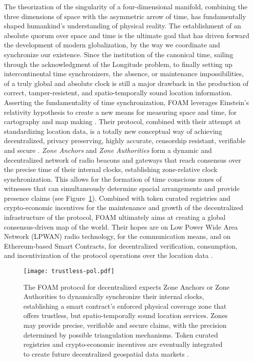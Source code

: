 The theorization of the singularity of a four-dimensional manifold, combining the three dimensions of space with the asymmetric arrow of time, has fundamentally shaped humankind's understanding of physical reality. The establishment of an absolute quorum over space and time is the ultimate goal that has driven forward the development of modern globalization, by the way we coordinate and synchronize our existence. Since the institution of the canonical time, sailing through the acknowledgment of the Longitude problem, to finally setting up intercontinental time synchronizers, the absence, or maintenance impossibilities, of a truly global and absolute clock is still a major drawback in the production of correct, tamper-resistent, and spatio-temporally sound location information. Asserting the fundamentality of time synchronization, FOAM leverages Einstein's relativity hypothesis to create a new means for measuring space and time, for cartography and map making \cite{king_2020}. Their protocol, combined with their attempt at standardizing location data, is a totally new conceptual way of achieving decentralized, privacy preserving, highly accurate, censorship resistant, verifiable and secure \pol{}. \emph{Zone Anchors} and \emph{Zone Authorities} form a dynamic and decentralized network of radio beacons and gateways that reach consensus over the precise time of their internal clocks, establishing zone-relative clock synchronization. This allows for the formation of time conscious zones of witnesses that can simultaneously determine spacial arrangements and provide presence claims (see Figure~\ref{fig:trustless-pol}). Combined with token curated registries and crypto-economic incentives for the maintenance and growth of the decentralized infrastructure of the protocol, FOAM ultimately aims at creating a global consensus-driven map of the world. Their hopes are on Low Power Wide Area Network (LPWAN) radio technology, for the communication means, and on Ethereum-based Smart Contracts, for decentralized verification, consumption, and incentivization of the protocol operations over the location data \cite{foam-white-paper}.

\begin{figure}[ht]
    \begin{center}
    \texttt{[image: trustless-pol.pdf]}
    \caption{The FOAM protocol for decentralized \pol{} expects Zone Anchors or Zone Authorities to dynamically synchronize their internal clocks, establishing a smart contract's enforced physical coverage zone that offers trustless, but spatio-temporally sound location services. Zones may provide precise, verifiable and secure \pol{} claims, with the precision determined by possible triangulation mechanisms. Token curated registries and crypto-economic incentives are eventually integrated to create future decentralized geospatial data markets \cite{foam-white-paper}.}
    \label{fig:trustless-pol}
    \end{center}
\end{figure}

